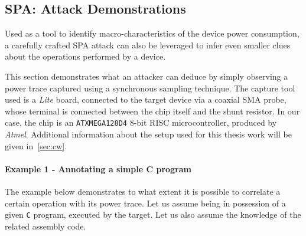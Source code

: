         \subsection{SPA: Attack Demonstrations}\label{subsec:SPA_examples}
        Used as a tool to identify macro-characteristics of the device power consumption, a carefully crafted SPA attack can also be leveraged to infer even smaller clues about the operations performed by a device. 
        

        This section demonstrates what an attacker can deduce by simply observing a power trace captured using a synchronous sampling technique. The capture tool used is a \cw{} \emph{Lite} board, connected to the target device via a coaxial SMA probe, whose terminal is connected between the chip itself and the shunt resistor. In our case, the chip is an \texttt{ATXMEGA128D4} 8-bit RISC microcontroller, produced by \emph{Atmel}. Additional information about the setup used for this thesis work will be given in~\ref{sec:cw}.

\newpage

        \paragraph{Example 1 - Annotating a simple C program}\label{par:ex_spa1}
            \noindent The example below demonstrates to what extent it is possible to correlate a certain operation with its power trace. Let us assume being in possession of a given \texttt{C} program, executed by the \xmega{} target. Let us also assume the knowledge of the related assembly code. 
            
